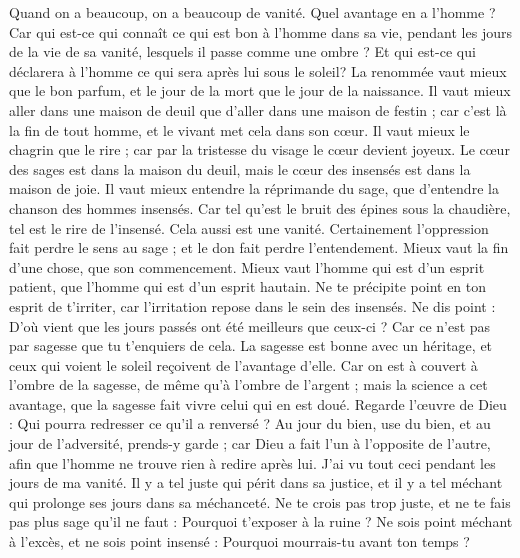 \begin{multicols}{2}
Quand on a beaucoup, on a beaucoup de vanité. Quel avantage en a l'homme ? 
Car qui est-ce qui connaît ce qui est bon à l'homme dans sa vie, pendant les jours de la vie de sa vanité, lesquels il passe comme une ombre ? Et qui est-ce qui déclarera à l'homme ce qui sera après lui sous le soleil?
\VerseOne{}La renommée vaut mieux que le bon parfum, et le jour de la mort que le jour de la naissance.
Il vaut mieux aller dans une maison de deuil que d'aller dans une maison de festin ; car c'est là la fin de tout homme, et le vivant met cela dans son cœur.
Il vaut mieux le chagrin que le rire ; car par la tristesse du visage le cœur devient joyeux.
Le cœur des sages est dans la maison du deuil, mais le cœur des insensés est dans la maison de joie.
Il vaut mieux entendre la réprimande du sage, que d'entendre la chanson des hommes insensés.
Car tel qu'est le bruit des épines sous la chaudière, tel est le rire de l'insensé. Cela aussi est une vanité. 
Certainement l'oppression fait perdre le sens au sage ; et le don fait perdre l'entendement. 
Mieux vaut la fin d'une chose, que son commencement. Mieux vaut l'homme qui est d'un esprit patient, que l'homme qui est d'un esprit hautain. 
Ne te précipite point en ton esprit de t'irriter, car l'irritation repose dans le sein des insensés.
Ne dis point : D'où vient que les jours passés ont été meilleurs que ceux-ci ? Car ce n'est pas par sagesse que tu t'enquiers de cela. 
 La sagesse est bonne avec un héritage, et ceux qui voient le soleil reçoivent de l'avantage d'elle.
Car on est à couvert à l'ombre de la sagesse, de même qu'à l'ombre de l'argent ; mais la science a cet avantage, que la sagesse fait vivre celui qui en est doué. 
Regarde l'œuvre de Dieu : Qui pourra redresser ce qu'il a renversé ?
Au jour du bien, use du bien, et au jour de l'adversité, prends-y garde ; car Dieu a fait l'un à l'opposite de l'autre, afin que l'homme ne trouve rien à redire après lui. 
J'ai vu tout ceci pendant les jours de ma vanité. Il y a tel juste qui périt dans sa justice, et il y a tel méchant qui prolonge ses jours dans sa méchanceté.
Ne te crois pas trop juste, et ne te fais pas plus sage qu'il ne faut : Pourquoi t’exposer à la ruine ?
Ne sois point méchant à l'excès, et ne sois point insensé : Pourquoi mourrais-tu avant ton temps ?

\end{multicols}
